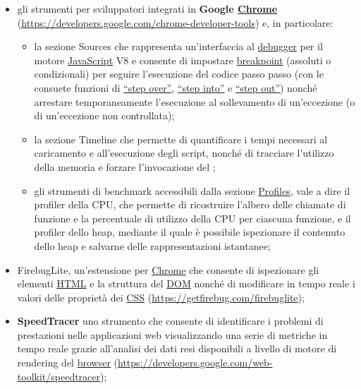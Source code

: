 {\begin{itemize}
 \begin{itemize}
   \item \textbf{Unicorn} in qualità di strumento di validazione unificato (\url{http://validator.w3.org/unicorn});
   \item \textbf{CSS Valitatom Service} come utilità di validazione per i fogli di stile a cascata (\url{http://jigsaw.w3.org/css-validator});
 \end{itemize}
 \item gli strumenti per sviluppatori integrati in \textbf{Google \underline{Chrome}} (\url{https://developers.google.com/chrome-developer-tools}) e, in particolare:
   \begin{itemize}
   \item la sezione Sources che rappresenta un'interfaccia al \underline{debugger} per il motore \underline{JavaScript} V8 e consente di impostare \underline{breakpoint} (assoluti o condizionali) per seguire l'esecuzione del codice passo passo (con le consuete funzioni di \underline{``step over''}, \underline{``step into''} e \underline{``step out''}) nonché arrestare temporaneamente l'esecuzione al sollevamento di un'eccezione (o di un'eccezione non controllata);
   \item la sezione Timeline che permette di quantificare i tempi necessari al caricamento e all'esecuzione degli script, nonché di tracciare l'utilizzo della memoria e forzare l'invocazione del ;
   \item  gli strumenti di benchmark accessibili dalla sezione \underline{Profiles}, vale a dire il profiler della CPU, che permette di ricostruire l'albero delle chiamate di funzione e la percentuale di utilizzo della CPU per ciascuna funzione, e il profiler dello heap, mediante il quale è possibile ispezionare il contenuto dello heap e salvarne delle rappresentazioni istantanee;
   \end{itemize}
  \item FirebugLite, un'estensione per \underline{Chrome} che consente di ispezionare gli elementi \underline{HTML} e la struttura del \underline{DOM} nonché di modificare in tempo reale i valori delle proprietà dei \underline{CSS} (\url{https://getfirebug.com/firebuglite});
  \item \textbf{SpeedTracer} uno strumento che consente di identificare i problemi di prestazioni nelle applicazioni web visualizzando una serie di metriche in tempo reale grazie all'analisi dei dati resi disponibili a livello di motore di rendering del \underline{browser} (\url{https://developers.google.com/web-toolkit/speedtracer});

\end{itemize}}
